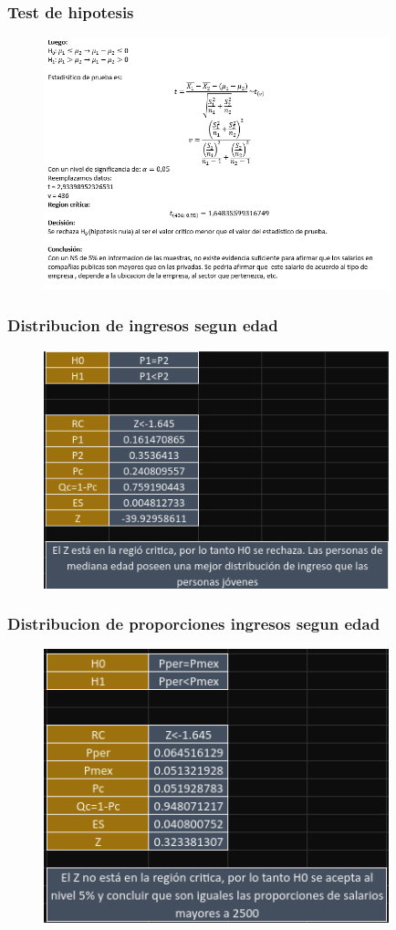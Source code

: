 \documentclass{beamer}
\begin{document}
\begin{frame}
  \frametitle{Test de hipotesis}
\begin{figure}[t]
    \includegraphics[width=10cm]{Screenshot_20221028_235052.png}
\end{figure}
\end{frame}

\begin{frame}
  \frametitle{Distribucion de ingresos segun edad}
\begin{figure}[t]
    \includegraphics[width=10cm]{cuyate1.png}
\end{figure}
\end{frame}


\begin{frame}
  \frametitle{Distribucion de proporciones ingresos segun edad}
\begin{figure}[t]
    \includegraphics[width=10cm]{cuyate2.png}
\end{figure}
\end{frame}
\end{document}
